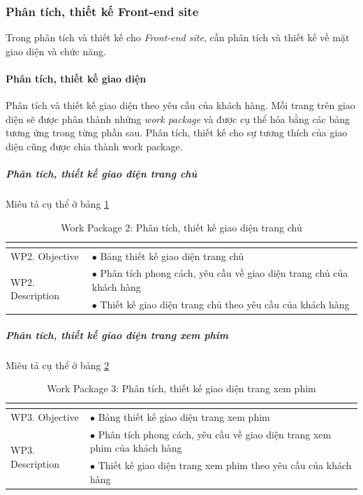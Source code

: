 \documentclass[a4paper]{book}
\begin{document}
\subsubsection{Phân tích, thiết kế Front-end site}
Trong phân tích và thiết kế cho \textit{Front-end site}, cần phân tích và thiết kế về mặt giao diện và chức năng.
\paragraph{Phân tích, thiết kế giao diện}
Phân tích và thiết kế giao diện theo yêu cầu của khách hàng. Mỗi trang trên giao diện sẽ được phân thành những \textit{work package} và được cụ thể hóa bằng các bảng tương ứng trong từng phần sau. Phân tích, thiết kế cho sự tương thích của giao diện cũng được chia thành work package.
\subparagraph{Phân tích, thiết kế giao diện trang chủ}Miêu tả cụ thể ở bảng \ref{table:front_end_thietke_trangchu}
\begin{table}[h!]
	\begin{center}
		\begin{tabular}{|p{4cm}|p{10cm}|}
			\hline
			\multicolumn{2}{|c|}{\cellcolor[HTML]{363636}{\color[HTML]{FFFFFF}Work package 2: Phân tích, thiết kế giao diện trang chủ}}\\
			\hline
			\multirow{1}{*}{WP2. Objective} & $\bullet$ Bảng thiết kế giao diện trang chủ\\
			\hline
			\multirow{2}{*}{WP2. Description} & $\bullet$ Phân tích phong cách, yêu cầu về giao diện trang chủ của khách hàng \\
			& $\bullet$ Thiết kế giao diện trang chủ theo yêu cầu của khách hàng\\
			\hline
		\end{tabular}
		\caption{Work Package 2: Phân tích, thiết kế giao diện trang chủ}
		\label{table:front_end_thietke_trangchu}
	\end{center}
\end{table}
\subparagraph{Phân tích, thiết kế giao diện trang xem phim}Miêu tả cụ thể ở bảng \ref{table:frontend_thietke_trangxemphim}
\begin{table}[h!]
	\begin{center}
		\begin{tabular}{|p{4cm}|p{10cm}|}
			\hline
			\multicolumn{2}{|c|}{\cellcolor[HTML]{363636}{\color[HTML]{FFFFFF}Work package 3: Phân tích, thiết kế giao diện trang xem phim}}\\
			\hline
			\multirow{1}{*}{WP3. Objective} & $\bullet$ Bảng thiết kế giao diện trang xem phim\\
			\hline
			\multirow{2}{*}{WP3. Description} & $\bullet$ Phân tích phong cách, yêu cầu về giao diện trang xem phim của khách hàng \\
			& $\bullet$ Thiết kế giao diện trang xem phim theo yêu cầu của khách hàng\\
			\hline
		\end{tabular}
		\caption{Work Package 3: Phân tích, thiết kế giao diện trang xem phim}
		\label{table:frontend_thietke_trangxemphim}
	\end{center}
\end{table}
\end{document}
